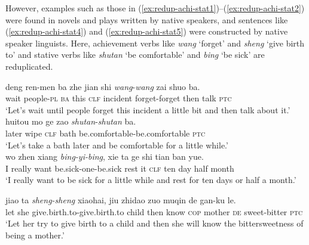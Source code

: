 \documentclass[11pt,a4paper,fleqn,draft]{article}
\let\textbf\emph
\begin{document}
However, examples such as those in (\ref{ex:redup-achi-stat1})--(\ref{ex:redup-achi-stat2}) were found in novels and plays written by native speakers, and  sentences like (\ref{ex:redup-achi-stat4}) and (\ref{ex:redup-achi-stat5}) were constructed by native speaker linguists.
Here, achievement verbs like \emph{wang} `forget' and \emph{sheng} `give birth to' and stative verbs like \emph{shutan} `be comfortable' and \emph{bing} `be sick' are reduplicated.

\ea
\ea\label{ex:redup-achi-stat1}
\gll deng ren-men ba zhe jian shi \textbf{wang}-\textbf{wang} zai shuo ba.\footnotemark\\
wait people-\textsc{pl} \textsc{ba} this \textsc{clf} incident forget-forget then talk \textsc{ptc}\\
\glt `Let's wait until people forget this incident a little bit and then talk about it.'\\

\ex\label{ex:redup-achi-stat2}
\gll huitou mo ge zao \textbf{shutan}-\textbf{shutan} ba.\footnotemark\\
later wipe \textsc{clf} bath be.comfortable-be.comfortable \textsc{ptc}\\
\glt `Let's take a bath later and be comfortable for a little while.'\\

\ex\label{ex:redup-achi-stat4}
\gll wo zhen xiang \textbf{bing-yi-bing}, xie ta ge shi tian ban yue.\\
I really want be.sick-one-be.sick rest it \textsc{clf} ten day half month\\ 
\glt `I really want to be sick for a little while and rest for ten days or half a month.'

\ex\label{ex:redup-achi-stat5}
\gll jiao ta \textbf{sheng-sheng} xiaohai, jiu zhidao zuo muqin de gan-ku le.\\
let she give.birth.to-give.birth.to child then know \textsc{cop} mother \textsc{de} sweet-bitter \textsc{ptc}\\ 
\glt `Let her try to give birth to a child and then she will know the bittersweetness of being a mother.'
\z
\z
\end{document}
